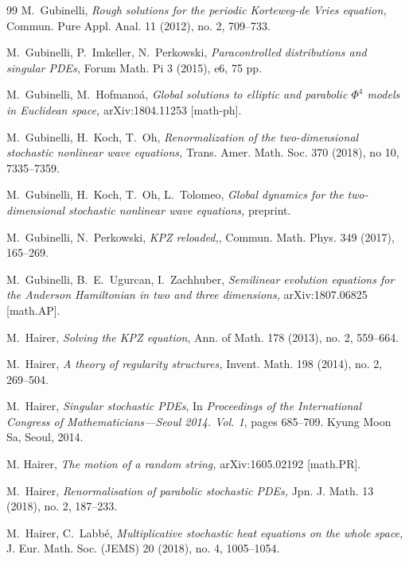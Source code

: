 \documentclass[%
11pt,  reqno]{amsart}
\newcommand{\1}{\hspace{0.2mm}\text{I}\hspace{0.2mm}}
\numberwithin{equation}{section}
\numberwithin{theorem}{section}
\begin{document}
\begin{thebibliography}{99}
M.~Gubinelli,
{\it Rough solutions for the periodic Korteweg-de Vries equation,}
 Commun. Pure Appl. Anal. 11 (2012), no. 2, 709--733.

M.~Gubinelli, P.~Imkeller, N.~Perkowski, 
{\it Paracontrolled distributions and singular PDEs,} Forum Math. Pi 3 (2015), e6, 75 pp. 


M.~Gubinelli, M.~Hofmano\'a, 
{\it Global solutions to elliptic and parabolic $\Phi^4$ models in Euclidean space,}
arXiv:1804.11253 [math-ph].

M.~Gubinelli, H.~Koch, T.~Oh,
{\it  Renormalization of the two-dimensional stochastic nonlinear wave equations,}
 Trans. Amer. Math. Soc.
 370 (2018), no 10, 7335--7359.
 
M.~Gubinelli, H.~Koch, T.~Oh, L.~Tolomeo,
{\it Global dynamics for  the two-dimensional stochastic nonlinear wave equations,}
preprint.





M.~Gubinelli, N.~Perkowski, 
{\it   KPZ reloaded,},
Commun. Math. Phys. 349 (2017), 165--269.


M.~Gubinelli, B.~E.~Ugurcan,  I.~Zachhuber,
{\it Semilinear evolution equations for the {Anderson} {Hamiltonian} in
  two and three dimensions,}
arXiv:1807.06825 [math.AP].


M.~Hairer, 
{\it Solving the KPZ equation}, Ann. of Math.  178 (2013), no. 2, 559--664. 

M.~Hairer, 
{\it A theory of regularity structures,} Invent. Math. 198 (2014), no. 2, 269--504. 


M.~Hairer,
{\it Singular stochastic {PDE}s},
In {\em Proceedings of the {I}nternational {C}ongress of
  {M}athematicians---{S}eoul 2014. {V}ol. 1}, pages 685--709. Kyung Moon Sa,
  Seoul, 2014.


M. Hairer,
{\it The motion of a random string,}
arXiv:1605.02192 [math.PR].


M.~Hairer,
{\it Renormalisation of parabolic stochastic {PDE}s,}
 Jpn. J. Math. 13 (2018), no. 2, 187--233.



M.~Hairer, C.~Labb\'{e},
{\it  Multiplicative stochastic heat equations on the whole space,}
J. Eur. Math. Soc. (JEMS) 20 (2018), no. 4, 1005--1054.



\end{thebibliography}
\end{document}
